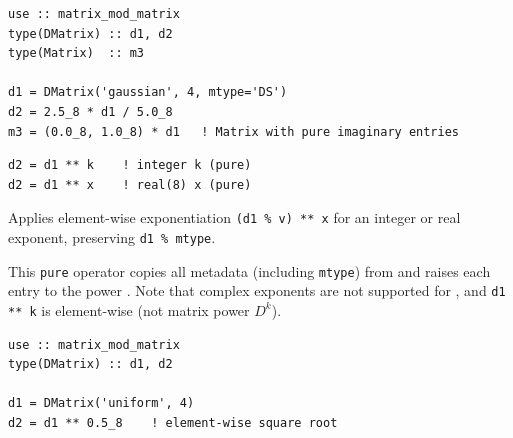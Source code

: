 \lstset{language=[95]Fortran}
\begin{lstlisting}
use :: matrix_mod_matrix
type(DMatrix) :: d1, d2
type(Matrix)  :: m3

d1 = DMatrix('gaussian', 4, mtype='DS')
d2 = 2.5_8 * d1 / 5.0_8
m3 = (0.0_8, 1.0_8) * d1   ! Matrix with pure imaginary entries
\end{lstlisting}


\lstset{language=[95]Fortran}
\begin{lstlisting}
d2 = d1 ** k    ! integer k (pure)
d2 = d1 ** x    ! real(8) x (pure)
\end{lstlisting}

Applies element-wise exponentiation \texttt{(d1 \% v) ** x} for an integer or real exponent, preserving \texttt{d1 \% mtype}.

This \texttt{pure} operator copies all metadata (including \texttt{mtype}) from  and raises each entry to the power . Note that complex exponents are not supported for , and \texttt{d1 ** k} is element-wise (not matrix power $D^k$).

\begin{description}[leftmargin=2.2cm, style=nextline]
\end{description}

\lstset{language=[95]Fortran}
\begin{lstlisting}
use :: matrix_mod_matrix
type(DMatrix) :: d1, d2

d1 = DMatrix('uniform', 4)
d2 = d1 ** 0.5_8    ! element-wise square root
\end{lstlisting}



